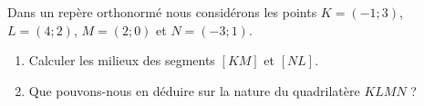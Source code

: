 
\begin{exercice}\label{exosmath-0487}

Dans un repère orthonormé nous considérons les points \( K=(-1;3)\), \( L=(4;2)\), \( M=(2;0)\) et \( N=(-3;1)\).
\begin{enumerate}
    \item
        Calculer les milieux des segments \( [KM]\) et \( [NL]\).
    \item
        Que pouvons-nous en déduire sur la nature du quadrilatère \( KLMN\) ?
\end{enumerate}

\end{exercice}
